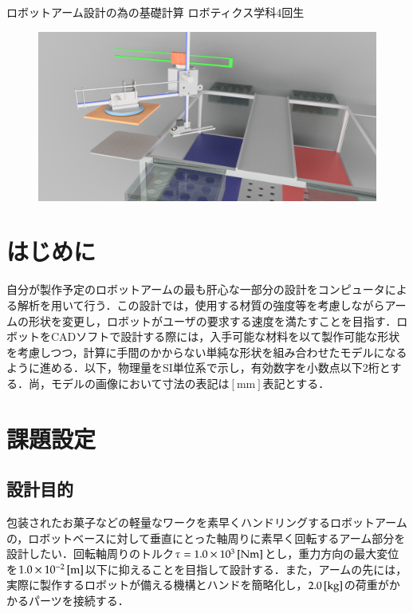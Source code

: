 \documentclass[10pt,b5paper,papersize,dvipdfmx]{jsbook}
\begin{document}

\newcommand\abesec[1]{\ref{#1}節}


\kaishititle%
  {ロボットアーム設計の為の基礎計算}%
  {ロボティクス学科4回生}%
  {}%

\begin{figure}[htbp]
  \centering
  \includegraphics[width=12cm]{img/robot_and_field.png}
\end{figure}

%
\section*{はじめに}
自分が製作予定のロボットアームの最も肝心な一部分の設計をコンピュータによる解析を用いて行う．この設計では，使用する材質の強度等を考慮しながらアームの形状を変更し，ロボットがユーザの要求する速度を満たすことを目指す．ロボットをCADソフトで設計する際には，入手可能な材料を以て製作可能な形状を考慮しつつ，計算に手間のかからない単純な形状を組み合わせたモデルになるように進める．以下，物理量をSI単位系で示し，有効数字を小数点以下2桁とする．尚，モデルの画像において寸法の表記は$[\mathrm{mm}]$表記とする．

%
\section{課題設定}
\subsection{設計目的}
包装されたお菓子などの軽量なワークを素早くハンドリングするロボットアームの，ロボットベースに対して垂直にとった軸周りに素早く回転するアーム部分を設計したい．回転軸周りのトルク$\tau =1.0 \times 10^3 \tani*{Nm}$とし，重力方向の最大変位を$1.0 \times 10^{-2} \tani*{m}$以下に抑えることを目指して設計する．また，アームの先には，実際に製作するロボットが備える機構とハンドを簡略化し，$2.0 \tani*{kg}$の荷重がかかるパーツを接続する．
\end{document}
